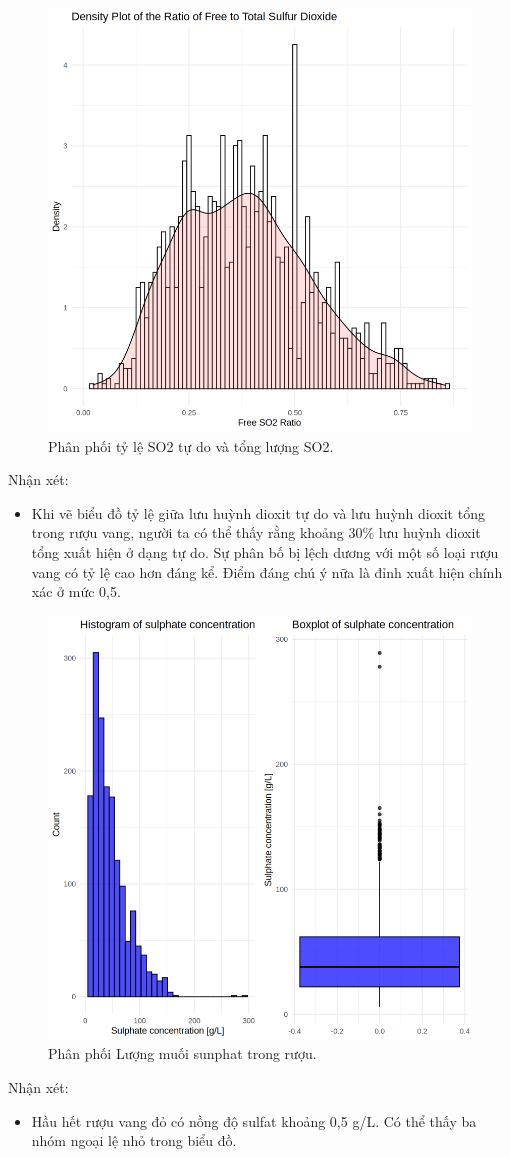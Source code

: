 \begin{figure}[H]
    \centering
    \includegraphics[width=0.75\columnwidth]{wine_figures/red_ratio.png}
    \caption{Phân phối tỷ lệ SO2 tự do và tổng lượng SO2.}
    \label{fig:red_free_so2}
\end{figure}
Nhận xét:
\begin{itemize}
    \item Khi vẽ biểu đồ tỷ lệ giữa lưu huỳnh dioxit tự do và lưu huỳnh dioxit tổng trong rượu vang, người ta có thể thấy rằng khoảng 30\% lưu huỳnh dioxit tổng xuất hiện ở dạng tự do. Sự phân bố bị lệch dương với một số loại rượu vang có tỷ lệ cao hơn đáng kể. Điểm đáng chú ý nữa là đỉnh xuất hiện chính xác ở mức 0,5.
\end{itemize}

\begin{figure}[H]
    \centering
    \includegraphics[width=0.75\columnwidth]{wine_figures/red_sulphate.png}
    \caption{Phân phối Lượng muối sunphat trong rượu.}
    \label{fig:red_sulphate}
\end{figure}
Nhận xét:
\begin{itemize}
    \item Hầu hết rượu vang đỏ có nồng độ sulfat khoảng 0,5 g/L. Có thể thấy ba nhóm ngoại lệ nhỏ trong biểu đồ.
\end{itemize}

